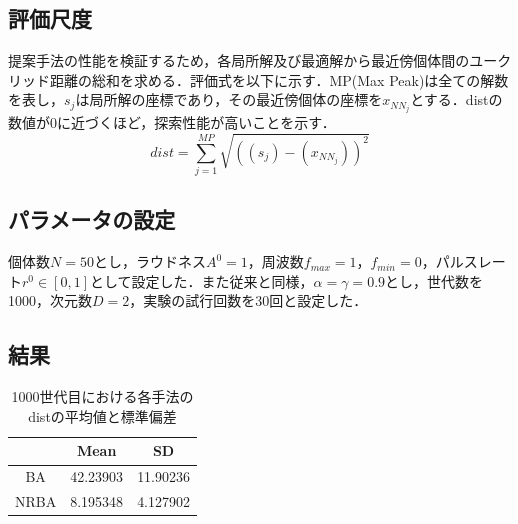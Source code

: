 \documentclass[twocolumn, a4paper]{UECIEresume}
\begin{document}
\subsection{評価尺度}
提案手法の性能を検証するため，各局所解及び最適解から最近傍個体間のユークリッド距離の総和を求める．評価式を以下に示す．MP(Max Peak)は全ての解数を表し，$s_j$は局所解の座標であり，その最近傍個体の座標を${x_{NN_j}}$とする．distの数値が0に近づくほど，探索性能が高いことを示す．
\begin{equation}
dist = \sum_{j=1}^{MP} \sqrt{((s_j)-(x_{NN_j}))^2}
\end{equation}

\subsection{パラメータの設定}
個体数$N=50$とし，ラウドネス$A^0=1$，周波数$f_{max}=1$，${f_{min}=0}$，パルスレート$r^0 \in [0,1]$として設定した．また従来と同様，$\alpha= \gamma = 0.9$とし，世代数を1000，次元数$D=2$，実験の試行回数を30回と設定した．
\subsection{結果}
\begin{table}
\begin{center}
\caption{1000世代目における各手法のdistの平均値と標準偏差}
\label{tab}
\begin{tabular}{ccc}\hline
 & Mean & SD\\  \hline\hline
BA & 42.23903 & 11.90236 \\ 
NRBA & 8.195348 & 4.127902 \\ \hline
\end{tabular}
\end{center}
\end{table}
\end{document}
